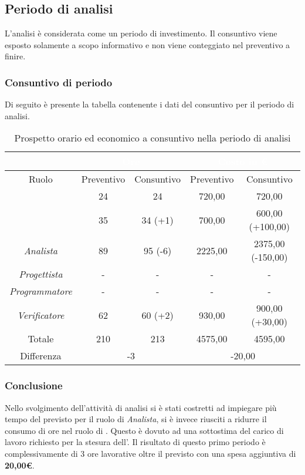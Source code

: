 \subsection{Periodo di analisi}
L'analisi è considerata come un periodo di investimento. Il consuntivo viene esposto solamente a scopo informativo e non viene conteggiato nel preventivo a finire.
\subsubsection{Consuntivo di periodo}
Di seguito è presente la tabella contenente i dati del consuntivo per il periodo di analisi.
\begin{table}[H]
	\centering
	\begin{tabular}{|c|c|c|c|c|}
		\rowcolor{darkblue} 
		&\multicolumn{2}{c|}{\textcolor{white}{Ore}}&\multicolumn{2}{c|}{\textcolor{white}{Costo in €}}\\ \hline
		Ruolo			&	Preventivo			&	Consuntivo		&	Preventivo	&	Consuntivo\\ \hline
		{\Responsabile}		&	24					&	24				&	720,00		&	720,00 \\ \hline
		{\Amministratore}	&	35					&	34 (+1)			&	700,00		&	600,00 (+100,00) \\ \hline
		\textit{Analista}	&	89					&	95 (-6)			&	2225,00		&	2375,00 (-150,00) \\ \hline
		\textit{Progettista}& 	-					&	- 				& 	-			&  	- \\ \hline
		\textit{Programmatore}& -					& 	-				& 	-			&  	- \\ \hline
		\textit{Verificatore}&	62					&	60 (+2)			&	930,00		&	900,00 (+30,00) \\ \hline
		Totale				&	210					&	213				&	4575,00		&	4595,00 \\ \hline
		Differenza			& 	\multicolumn{2}{c|}{-3} 			&\multicolumn{2}{c|}{-20,00}\\ \hline
	\end{tabular}
	\caption{Prospetto orario ed economico a consuntivo nella periodo di analisi}
\end{table}
\subsubsection{Conclusione}
Nello svolgimento dell'attività di analisi si è stati costretti ad impiegare più tempo del previsto per il ruolo di \textit{Analista}, si è invece riusciti a ridurre il consumo di ore nel ruolo di {\Amministratore}. Questo è dovuto ad una sottostima del carico di lavoro richiesto per la stesura dell'. Il risultato di questo primo periodo è complessivamente di 3 ore lavorative oltre il previsto con una spesa aggiuntiva di \textbf{20,00€}.\\
